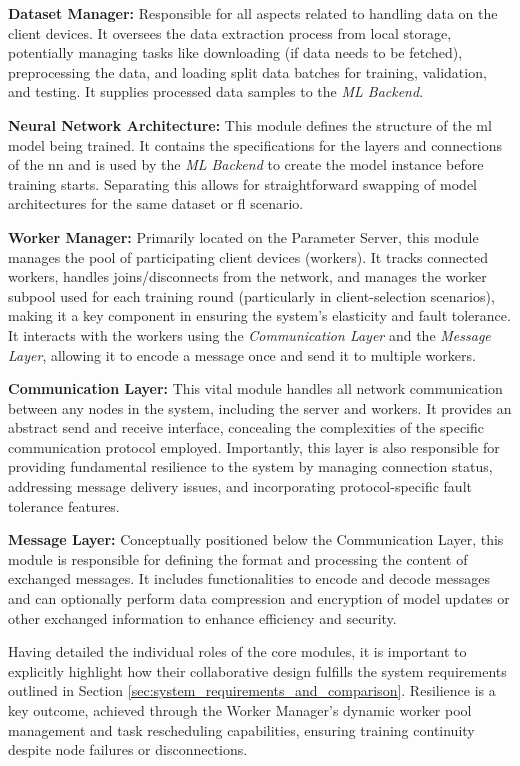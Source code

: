 \textbf{Dataset Manager:} Responsible for all aspects related to handling data on the client devices. It oversees the data extraction process from local storage, potentially managing tasks like downloading (if data needs to be fetched), preprocessing the data, and loading split data batches for training, validation, and testing. It supplies processed data samples to the \textit{ML Backend}.

\textbf{Neural Network Architecture:} This module defines the structure of the \ac{ml} model being trained. It contains the specifications for the layers and connections of the \ac{nn} and is used by the \textit{ML Backend} to create the model instance before training starts. Separating this allows for straightforward swapping of model architectures for the same dataset or \ac{fl} scenario.

\textbf{Worker Manager:} Primarily located on the Parameter Server, this module manages the pool of participating client devices (workers). It tracks connected workers, handles joins/disconnects from the network, and manages the worker subpool used for each training round (particularly in client-selection scenarios), making it a key component in ensuring the system's elasticity and fault tolerance. It interacts with the workers using the \textit{Communication Layer} and the \textit{Message Layer}, allowing it to encode a message once and send it to multiple workers.

\textbf{Communication Layer:} This vital module handles all network communication between any nodes in the system, including the server and workers. It provides an abstract send and receive interface, concealing the complexities of the specific communication protocol employed. Importantly, this layer is also responsible for providing fundamental resilience to the system by managing connection status, addressing message delivery issues, and incorporating protocol-specific fault tolerance features.

\textbf{Message Layer:} Conceptually positioned below the Communication Layer, this module is responsible for defining the format and processing the content of exchanged messages. It includes functionalities to encode and decode messages and can optionally perform data compression and encryption of model updates or other exchanged information to enhance efficiency and security.

Having detailed the individual roles of the core modules, it is important to explicitly highlight how their collaborative design fulfills the system requirements outlined in Section \ref{sec:system_requirements_and_comparison}. Resilience is a key outcome, achieved through the Worker Manager's dynamic worker pool management and task rescheduling capabilities, ensuring training continuity despite node failures or disconnections. 


